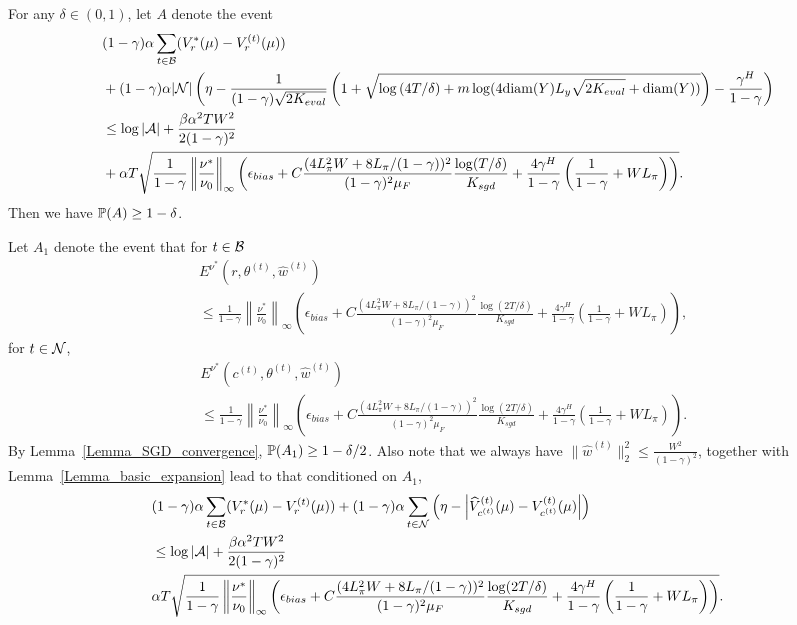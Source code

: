 \begin{lemma}\label{Lemma_whp_basic_expansion}
For any $\delta\in(0,1)$, let $A$ denote the event
$$
\begin{aligned}
&(1-\gamma)\alpha\sum_{t\in {\mathcal{B}}} (V_r^*(\mu)-V_r^{(t)}(\mu))\\
&+(1-\gamma)\alpha|{\mathcal{N}}|\left(\eta-\frac{1}{(1-\gamma)\sqrt{2K_{eval}}}\left(1+\sqrt{\log{(4T/\delta)}+m\log(4\mathrm{diam}(Y)L_y\sqrt{2K_{eval}}+\mathrm{diam}(Y))}\right)-\frac{\gamma^H}{1-\gamma}\right)\\
&\leq \log|{\mathcal{A}}|+\frac{\beta\alpha^2 TW^2}{2(1-\gamma)^2}\\
&+\alpha T\sqrt{\frac{1}{1-\gamma}\left\|\frac{\nu^*}{\nu_0}\right\|_\infty\left(\epsilon_{bias}+C\frac{(4L_\pi^2W+8L_\pi/(1-\gamma))^2}{(1-\gamma)^2\mu_F}\frac{\log(T/\delta)}{K_{sgd}}+\frac{4\gamma^H}{1-\gamma}\left(\frac{1}{1-\gamma}+WL_\pi\right)\right)}.
\end{aligned}
$$
Then we have ${\mathbb P}(A)\geq 1-\delta$.
\end{lemma}
Let $A_1$ denote the event that 
for $t\in{\mathcal{B}}$
$$
\begin{aligned}
     &E^{\nu^*}(r,\theta^{(t)}, \hat w^{(t)})\\
     &\leq \frac{1}{1-\gamma}\left\|\frac{\nu^*}{\nu_0}\right\|_\infty\left(\epsilon_{bias}+C\frac{(4L_\pi^2W+8L_\pi/(1-\gamma))^2}{(1-\gamma)^2\mu_F}\frac{\log(2T/\delta)}{K_{sgd}}+\frac{4\gamma^H}{1-\gamma}\left(\frac{1}{1-\gamma}+WL_\pi\right)\right),
\end{aligned}
$$
for $t\in{\mathcal{N}}$,
$$
\begin{aligned}
     &E^{\nu^*}(c^{(t)},\theta^{(t)}, \hat w^{(t)})\\
     &\leq \frac{1}{1-\gamma}\left\|\frac{\nu^*}{\nu_0}\right\|_\infty\left(\epsilon_{bias}+C\frac{(4L_\pi^2W+8L_\pi/(1-\gamma))^2}{(1-\gamma)^2\mu_F}\frac{\log(2T/\delta)}{K_{sgd}}+\frac{4\gamma^H}{1-\gamma}\left(\frac{1}{1-\gamma}+WL_\pi\right)\right).
\end{aligned}
$$
By Lemma~\ref{Lemma_SGD_convergence}, ${\mathbb P}(A_1)\geq 1-\delta/2$.
Also note that we always have $\|\hat w^{(t)}\|_2^2\leq \frac{W^2}{(1-\gamma)^2}$, together with Lemma~\ref{Lemma_basic_expansion} lead to that conditioned on $A_1$,
$$
\begin{aligned}
&(1-\gamma)\alpha\sum_{t\in {\mathcal{B}}} (V_r^*(\mu)-V_r^{(t)}(\mu))+(1-\gamma)\alpha\sum_{t\in{\mathcal{N}}}\left(\eta-\left|\widehat V_{c^{(t)}}^{(t)}(\mu)-V_{c^{(t)}}^{(t)}(\mu)\right|\right)\\
&\leq \log|{\mathcal{A}}|+\frac{\beta\alpha^2 TW^2}{2(1-\gamma)^2}\\
&\alpha T\sqrt{\frac{1}{1-\gamma}\left\|\frac{\nu^*}{\nu_0}\right\|_\infty\left(\epsilon_{bias}+C\frac{(4L_\pi^2W+8L_\pi/(1-\gamma))^2}{(1-\gamma)^2\mu_F}\frac{\log(2T/\delta)}{K_{sgd}}+\frac{4\gamma^H}{1-\gamma}\left(\frac{1}{1-\gamma}+WL_\pi\right)\right)}.
\end{aligned}
$$
